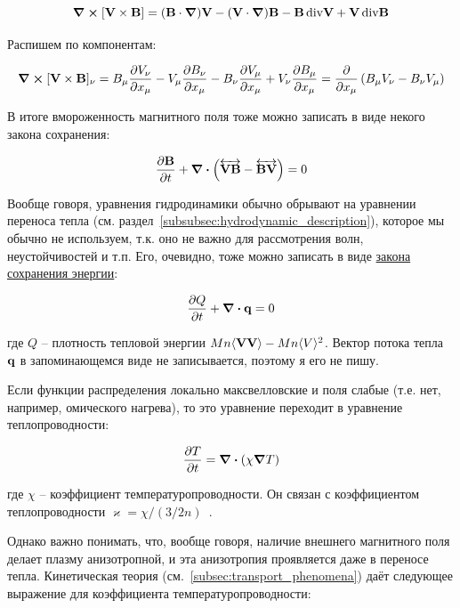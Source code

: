 \documentclass[10pt, a4paper]{article}
\begin{document}
\begin{equation*}
	\curl{[\vb{V}\times\vb{B}]} = (\vb{B}\cdot\grad)\vb{V} - (\vb{V}\cdot\grad)\vb{B} - \vb{B}\,\text{div}{\vb{V}} + \vb{V}\,\text{div}{\vb{B}}
\end{equation*}

Распишем по компонентам:

\begin{equation*}
	\curl{[\vb{V}\times\vb{B}]}_\nu = B_\mu \pdv{V_\nu}{x_\mu} - V_\mu \pdv{B_\nu}{x_\mu} - B_\nu\pdv{V_\mu}{x_\mu} + V_\nu\pdv{B_\mu}{x_\mu} = \pdv{}{x_\mu}\left( B_\mu V_\nu - B_\nu V_\mu \right)
\end{equation*}

В итоге вмороженность магнитного поля тоже можно записать в виде некого закона сохранения:

\begin{equation*}
	\pdv{\vb{B}}{t} + \div{\left( \overleftrightarrow{\vb{VB}} - \overleftrightarrow{\vb{BV}} \right)} = 0
\end{equation*}

Вообще говоря, уравнения гидродинамики обычно обрывают на уравнении переноса тепла (см. раздел~\ref{subsubsec:hydrodynamic_description}), которое мы обычно не используем, т.к. оно не важно для рассмотрения волн, неустойчивостей и т.п. Его, очевидно, тоже можно записать в виде \uline{закона сохранения энергии}:

\begin{equation*}
	\pdv{Q}{t} + \div{\vb{q}} = 0
\end{equation*}

где $Q$ -- плотность тепловой энергии $Mn\langle \vb{V}\vb{V} \rangle - Mn\langle V\rangle^2$. Вектор потока тепла $\vb{q}$ в запоминающемся виде не записывается, поэтому я его не пишу.

Если функции распределения локально максвелловские и поля слабые (т.е. нет, например, омического нагрева), то это уравнение переходит в уравнение теплопроводности:

\begin{equation}
	\label{eq:heat_equation}
	\pdv{T}{t} = \div{\left( \chi \grad T \right)}
\end{equation}

где $\chi$ -- коэффициент температуропроводности. Он связан с коэффициентом теплопроводности $\varkappa = \chi/(3/2n)$~\cite{kotelnikov}.

Однако важно понимать, что, вообще говоря, наличие внешнего магнитного поля делает плазму анизотропной, и эта анизотропия проявляется даже в переносе тепла. Кинетическая теория (см.~\ref{subsec:transport_phenomena}) даёт следующее выражение для коэффициента температуропроводности:
\end{document}
